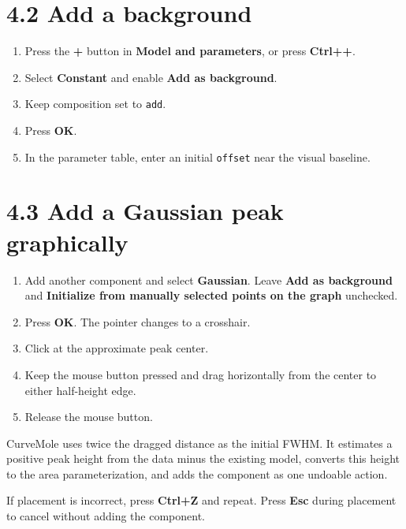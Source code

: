 \documentclass[
  10pt,
  a4paper,
  oneside]{scrreprt}
\providecommand{\tightlist}{%
  \setlength{\itemsep}{0pt}\setlength{\parskip}{0pt}}
\begin{document}
\hypertarget{add-a-background}{%
\section{4.2 Add a background}\label{add-a-background}}

\begin{enumerate}
\def\labelenumi{\arabic{enumi}.}
\tightlist
\item
  Press the \textbf{+} button in \textbf{Model and parameters}, or press
  \textbf{Ctrl++}.
\item
  Select \textbf{Constant} and enable \textbf{Add as background}.
\item
  Keep composition set to \texttt{add}.
\item
  Press \textbf{OK}.
\item
  In the parameter table, enter an initial \texttt{offset} near the
  visual baseline.
\end{enumerate}

\hypertarget{add-a-gaussian-peak-graphically}{%
\section{4.3 Add a Gaussian peak
graphically}\label{add-a-gaussian-peak-graphically}}

\begin{enumerate}
\def\labelenumi{\arabic{enumi}.}
\tightlist
\item
  Add another component and select \textbf{Gaussian}. Leave \textbf{Add
  as background} and \textbf{Initialize from manually selected points on
  the graph} unchecked.
\item
  Press \textbf{OK}. The pointer changes to a crosshair.
\item
  Click at the approximate peak center.
\item
  Keep the mouse button pressed and drag horizontally from the center to
  either half-height edge.
\item
  Release the mouse button.
\end{enumerate}

CurveMole uses twice the dragged distance as the initial FWHM. It
estimates a positive peak height from the data minus the existing model,
converts this height to the area parameterization, and adds the
component as one undoable action.

If placement is incorrect, press \textbf{Ctrl+Z} and repeat. Press
\textbf{Esc} during placement to cancel without adding the component.
\end{document}
